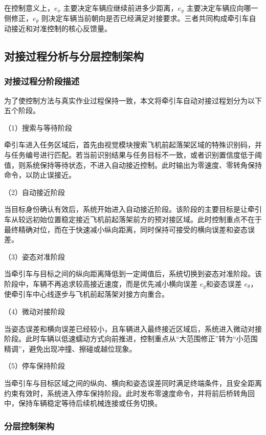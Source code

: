 \documentclass[UTF8,a4paper,12pt]{ctexart}
\begin{document}
在控制意义上，\(e_{x}\) 主要决定车辆应继续前进多少距离，\(e_{y}\) 主要决定车辆应向哪一侧修正，\(e_{\theta}\) 则决定车辆当前朝向是否已经满足对接要求。三者共同构成牵引车自动接近和对准控制的核心反馈量。

\subsection{对接过程分析与分层控制架构}\label{_Toc228997199}

\subsubsection{对接过程分阶段描述}\label{_Toc228997200}

为了使控制方法与真实作业过程保持一致，本文将牵引车自动对接过程划分为以下五个阶段。

（1）搜索与等待阶段

牵引车进入任务区域后，首先由视觉模块搜索飞机前起落架区域的特殊识别码，并与任务编号进行匹配。若当前识别结果与任务目标不一致，或者识别置信度低于阈值，则系统保持等待状态，不进入自动接近控制。此时输出为零速度、零转角保持命令，以防止误接近。

（2）自动接近阶段

当目标身份确认有效后，系统开始进入自动接近阶段。该阶段的主要目标是让牵引车从较远初始位置稳定接近飞机前起落架前方的预对接区域。此时控制重点不在于最终精确对位，而在于快速减小纵向距离，同时保持可接受的横向误差和姿态误差。

（3）姿态对准阶段

当牵引车与目标之间的纵向距离降低到一定阈值后，系统切换到姿态对准阶段。该阶段中，车辆不再追求较高接近速度，而是优先减小横向误差 \(e_{y}\)和姿态误差 \(e_{\theta}\)，使牵引车中心线逐步与飞机前起落架对接方向重合。

（4）微动对接阶段

当姿态误差和横向误差已经较小，且车辆进入最终接近区域后，系统进入微动对接阶段。此时车辆以低速蠕动方式向前推进，控制重点从``大范围修正''转为``小范围精调''，避免出现冲撞、擦碰或越位现象。

（5）停车保持阶段

当牵引车与目标区域之间的纵向、横向和姿态误差同时满足终端条件，且安全距离约束有效时，系统进入停车保持阶段。此时发布零速度命令，并将前后桥转角回中，保持车辆稳定等待后续机械连接或任务切换。

\subsubsection{分层控制架构}\label{_Toc228997201}
\end{document}
